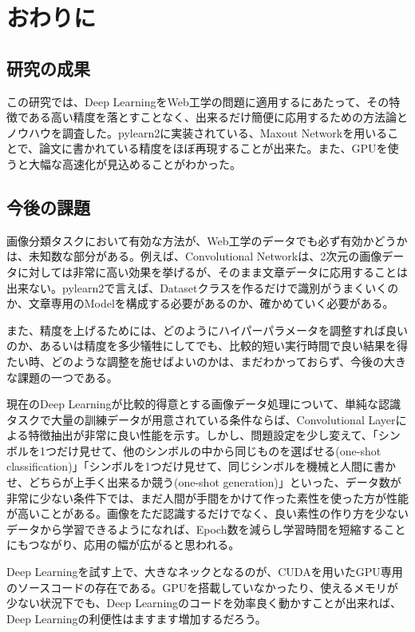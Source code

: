 \chapter{おわりに}
\section{研究の成果}
この研究では、Deep LearningをWeb工学の問題に適用するにあたって、その特徴である高い精度を落とすことなく、出来るだけ簡便に応用するための方法論とノウハウを調査した。pylearn2に実装されている、Maxout Networkを用いることで、論文に書かれている精度をほぼ再現することが出来た。また、GPUを使うと大幅な高速化が見込めることがわかった。

\section{今後の課題}
画像分類タスクにおいて有効な方法が、Web工学のデータでも必ず有効かどうかは、未知数な部分がある。例えば、Convolutional Networkは、2次元の画像データに対しては非常に高い効果を挙げるが、そのまま文章データに応用することは出来ない。pylearn2で言えば、Datasetクラスを作るだけで識別がうまくいくのか、文章専用のModelを構成する必要があるのか、確かめていく必要がある。\par
また、精度を上げるためには、どのようにハイパーパラメータを調整すれば良いのか、あるいは精度を多少犠牲にしてでも、比較的短い実行時間で良い結果を得たい時、どのような調整を施せばよいのかは、まだわかっておらず、今後の大きな課題の一つである。\par
現在のDeep Learningが比較的得意とする画像データ処理について、単純な認識タスクで大量の訓練データが用意されている条件ならば、Convolutional Layerによる特徴抽出が非常に良い性能を示す。しかし、問題設定を少し変えて、「シンボルを1つだけ見せて、他のシンボルの中から同じものを選ばせる(one-shot classification)」「シンボルを1つだけ見せて、同じシンボルを機械と人間に書かせ、どちらが上手く出来るか競う(one-shot generation)」といった、データ数が非常に少ない条件下では、まだ人間が手間をかけて作った素性を使った方が性能が高いことがある\cite{lake2013one}。画像をただ認識するだけでなく、良い素性の作り方を少ないデータから学習できるようになれば、Epoch数を減らし学習時間を短縮することにもつながり、応用の幅が広がると思われる。\par
Deep Learningを試す上で、大きなネックとなるのが、CUDAを用いたGPU専用のソースコードの存在である。GPUを搭載していなかったり、使えるメモリが少ない状況下でも、Deep Learningのコードを効率良く動かすことが出来れば、Deep Learningの利便性はますます増加するだろう。\par
